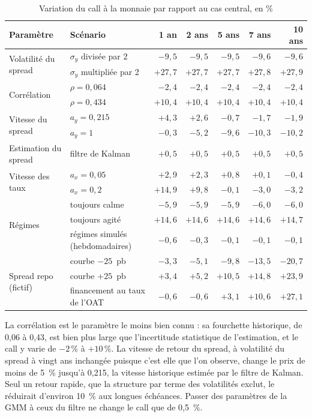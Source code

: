 \begin{table}[htbp]
\centering\small
\caption{Variation du call à la monnaie par rapport au cas central, en \%}
\label{tab:sensibilites}
\begin{tabular}{@{}llrrrrr@{}}
\toprule
Paramètre & Scénario & 1 an & 2 ans & 5 ans & 7 ans & 10 ans \\
\midrule
\multirow{2}{*}{Volatilité du spread} & $\sigma_y$ divisée par 2 & $-9{,}5$ & $-9{,}5$ & $-9{,}5$ & $-9{,}6$ & $-9{,}6$ \\
 & $\sigma_y$ multipliée par 2 & $+27{,}7$ & $+27{,}7$ & $+27{,}7$ & $+27{,}8$ & $+27{,}9$ \\
\multirow{2}{*}{Corrélation} & $\rho = 0{,}064$ & $-2{,}4$ & $-2{,}4$ & $-2{,}4$ & $-2{,}4$ & $-2{,}4$ \\
 & $\rho = 0{,}434$ & $+10{,}4$ & $+10{,}4$ & $+10{,}4$ & $+10{,}4$ & $+10{,}4$ \\
\multirow{2}{*}{Vitesse du spread} & $a_y = 0{,}215$ & $+4{,}3$ & $+2{,}6$ & $-0{,}7$ & $-1{,}7$ & $-1{,}9$ \\
 & $a_y = 1$ & $-0{,}3$ & $-5{,}2$ & $-9{,}6$ & $-10{,}3$ & $-10{,}2$ \\
Estimation du spread & filtre de Kalman & $+0{,}5$ & $+0{,}5$ & $+0{,}5$ & $+0{,}5$ & $+0{,}5$ \\
\multirow{2}{*}{Vitesse des taux} & $a_x = 0{,}05$ & $+2{,}9$ & $+2{,}3$ & $+0{,}8$ & $+0{,}1$ & $-0{,}4$ \\
 & $a_x = 0{,}2$ & $+14{,}9$ & $+9{,}8$ & $-0{,}1$ & $-3{,}0$ & $-3{,}2$ \\
\multirow{3}{*}{Régimes} & toujours calme & $-5{,}9$ & $-5{,}9$ & $-5{,}9$ & $-6{,}0$ & $-6{,}0$ \\
 & toujours agité & $+14{,}6$ & $+14{,}6$ & $+14{,}6$ & $+14{,}6$ & $+14{,}7$ \\
 & régimes simulés (hebdomadaires) & $-0{,}6$ & $-0{,}3$ & $-0{,}1$ & $-0{,}1$ & $-0{,}1$ \\
\multirow{3}{*}{Spread repo (fictif)} & courbe $-25$~pb & $-3{,}3$ & $-5{,}1$ & $-9{,}8$ & $-13{,}5$ & $-20{,}7$ \\
 & courbe $+25$~pb & $+3{,}4$ & $+5{,}2$ & $+10{,}5$ & $+14{,}8$ & $+23{,}9$ \\
 & financement au taux de l'OAT & $-0{,}6$ & $-0{,}6$ & $+3{,}1$ & $+10{,}6$ & $+27{,}1$ \\
\bottomrule
\end{tabular}
\end{table}

La corrélation est le paramètre le moins bien connu : sa fourchette historique, de 0,06 à 0,43, est bien plus
large que l'incertitude statistique de l'estimation, et le call y varie de $-2\,\%$ à $+10\,\%$. La vitesse de
retour du spread, à volatilité du spread à vingt ans inchangée puisque c'est elle que l'on observe, change le prix
de moins de 5~\% jusqu'à 0,215, la vitesse historique estimée par le filtre de Kalman. Seul un retour rapide, que
la structure par terme des volatilités exclut, le réduirait d'environ 10~\% aux longues échéances. Passer des
paramètres de la GMM à ceux du filtre ne change le call que de 0,5~\%.

